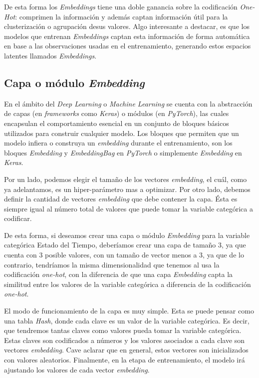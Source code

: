 \documentclass[11pt,a4paper,twoside]{thesis}
\begin{document}
De esta forma los \textit{Embeddings} tiene una doble ganancia sobre la
codificación \textit{One-Hot}: comprimen la información y además captan
información útil para la clusterización o agrupación desus valores. Algo
interesante a destacar, es que los modelos que entrenan \textit{Embeddings}
captan esta información de forma automática en base a las observaciones usadas
en el entrenamiento, generando estos espacios latentes llamados
\textit{Embeddings}.

\subsection{Capa o módulo \textit{Embedding}}

En el ámbito del \textit{Deep Learning} o \textit{Machine Learning} se cuenta
con la abstracción de capas (en \textit{frameworks} como \textit{Keras}) o
módulos (en \textit{PyTorch}), las cuales encapsulan el comportamiento esencial
en un conjunto de bloques básicos utilizados para construir cualquier modelo.
Los bloques que permiten que un modelo infiera o construya un
\textit{embedding} durante el entrenamiento, son los bloques \textit{Embedding}
y \textit{EmbeddingBag} en \textit{PyTorch} o simplemente \textit{Embedding} en
\textit{Keras}.

Por un lado, podemos elegir el tamaño de los vectores \textit{embedding}, el
cuál, como ya adelantamos, es un hiper-parámetro mas a optimizar. Por otro
lado, debemos definir la cantidad de vectores \textit{embedding} que debe
contener la capa. Ésta es siempre igual al número total de valores que puede
tomar la variable categórica a codificar.

De esta forma, si deseamos crear una capa o módulo \textit{Embedding} para la
variable categórica Estado del Tiempo, deberíamos crear una capa de tamaño 3,
ya que cuenta con 3 posible valores, con un tamaño de vector menos a 3, ya que
de lo contrario, tendríamos la misma dimensionalidad que tenemos al usa la
codificación \textit{one-hot}, con la diferencia de que una capa
\textit{Embedding} capta la similitud entre los valores de la variable
categórica a diferencia de la codificación \textit{one-hot}.

El modo de funcionamiento de la capa es muy simple. Esta se puede pensar como
una tabla \textit{Hash}, donde cada clave es un valor de la variable
categórica. Es decir, que tendremos tantas claves como valores pueda tomar la
variable categórica. Estas claves son codificados a números y los valores
asociados a cada clave son vectores \textit{embedding}. Cave aclarar que en
general, estos vectores son inicializados con valores aleatorios. Finalmente,
en la etapa de entrenamiento, el modelo irá ajustando los valores de cada
vector \textit{embedding}.
\end{document}
